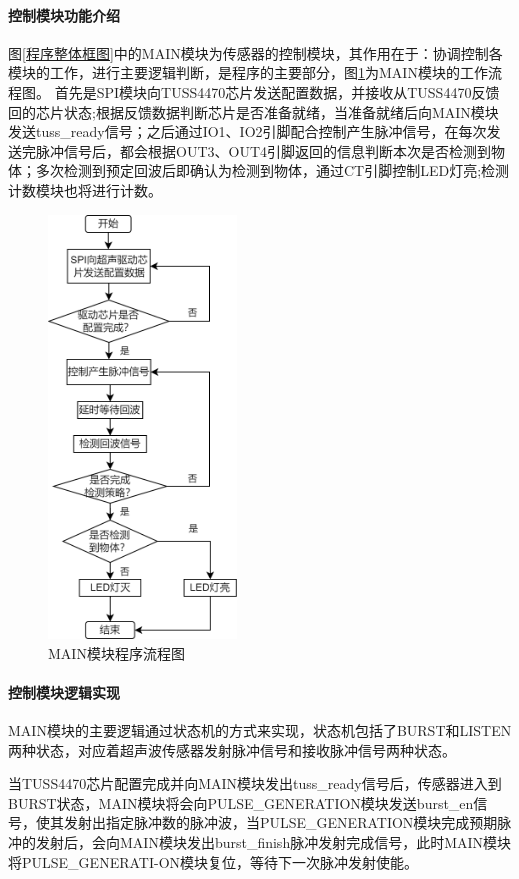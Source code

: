 \paragraph{控制模块功能介绍}
图\ref{程序整体框图}中的MAIN模块为传感器的控制模块，其作用在于：协调控制各模块的工作，进行主要逻辑判断，是程序的主要部分，图\ref{MAIN模块程序流程图}为MAIN模块的工作流程图。
首先是SPI模块向TUSS4470芯片发送配置数据，并接收从TUSS4470反馈回的芯片状态;根据反馈数据判断芯片是否准备就绪，当准备就绪后向MAIN模块发送tuss\_ready信号；之后通过IO1、IO2引脚配合控制产生脉冲信号，在每次发送完脉冲信号后，都会根据OUT3、OUT4引脚返回的信息判断本次是否检测到物体；多次检测到预定回波后即确认为检测到物体，通过CT引脚控制LED灯亮;检测计数模块也将进行计数。

\begin{figure}[ht]
	\centering
	\includegraphics[width=5cm]{figure/MAIN module flow chart.png}
	\caption{MAIN模块程序流程图}
	\label{MAIN模块程序流程图}
\end{figure}

\noindent
\paragraph{控制模块逻辑实现}
MAIN模块的主要逻辑通过状态机的方式来实现，状态机包括了BURST和LISTEN两种状态，对应着超声波传感器发射脉冲信号和接收脉冲信号两种状态。

当TUSS4470芯片配置完成并向MAIN模块发出tuss\_ready信号后，传感器进入到BURST状态，MAIN模块将会向PULSE\_GENERATION模块发送burst\_en信号，使其发射出指定脉冲数的脉冲波，当PULSE\_GENERATION模块完成预期脉冲的发射后，会向MAIN模块发出burst\_finish脉冲发射完成信号，此时MAIN模块将PULSE\_GENERATI-ON模块复位，等待下一次脉冲发射使能。

